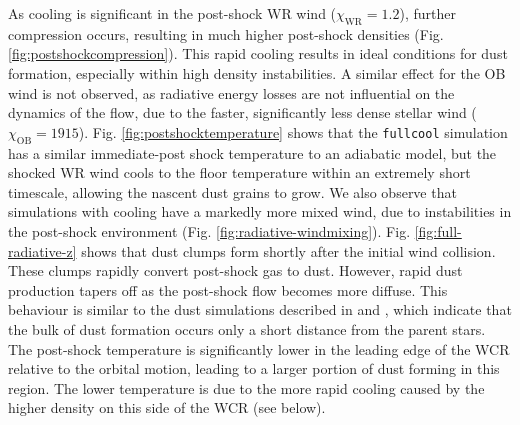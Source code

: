As cooling is significant in the post-shock WR wind ($\chi_\text{WR} = 1.2$), further compression occurs, resulting in much higher post-shock densities (Fig. \ref{fig:postshockcompression}).
This rapid cooling results in ideal conditions for dust formation, especially within high density instabilities.
A similar effect for the OB wind is not observed, as radiative energy losses are not influential on the dynamics of the flow, due to the faster, significantly less dense stellar wind ($\chi_\text{OB} = 1915$).
Fig. \ref{fig:postshocktemperature} shows that the \texttt{fullcool} simulation has a similar immediate-post shock temperature to an adiabatic model, but the shocked WR wind cools to the floor temperature within an extremely short timescale, allowing the nascent dust grains to grow.
We also observe that simulations with cooling have a markedly more mixed wind, due to instabilities in the post-shock environment (Fig. \ref{fig:radiative-windmixing}).
Fig. \ref{fig:full-radiative-z} shows that dust clumps form shortly after the initial wind collision.
These clumps rapidly convert post-shock gas to dust.
However, rapid dust production tapers off as the post-shock flow becomes more diffuse.
This behaviour is similar to the dust simulations described in \textcite{harriesThreedimensionalDustRadiativetransfer2004} and \textcite{hendrix_pinwheels_2016}, which indicate that the bulk of dust formation occurs only a short distance from the parent stars.
The post-shock temperature is significantly lower in the leading edge of the WCR relative to the orbital motion, leading to a larger portion of dust forming in this region.
The lower temperature is due to the more rapid cooling caused by the higher density on this side of the WCR (see below).

